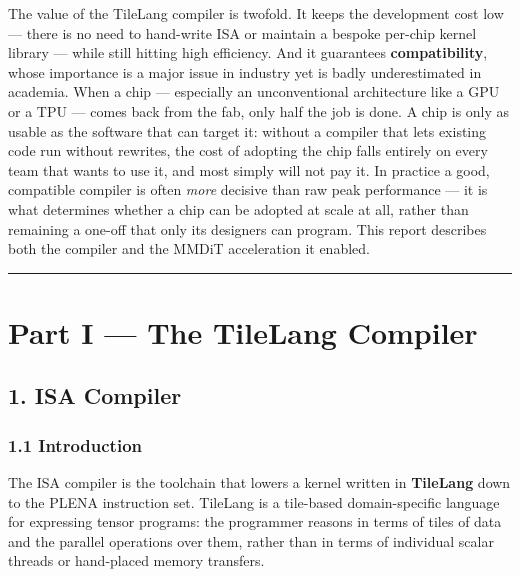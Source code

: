 \documentclass[
  10pt,
]{article}
\begin{document}
The value of the TileLang compiler is twofold. It keeps the development
cost low --- there is no need to hand-write ISA or maintain a bespoke
per-chip kernel library --- while still hitting high efficiency. And it
guarantees \textbf{compatibility}, whose importance is a major issue in
industry yet is badly underestimated in academia. When a chip ---
especially an unconventional architecture like a GPU or a TPU --- comes
back from the fab, only half the job is done. A chip is only as usable as
the software that can target it: without a compiler that lets existing
code run without rewrites, the cost of adopting the chip falls entirely
on every team that wants to use it, and most simply will not pay it. In
practice a good, compatible compiler is often \emph{more} decisive than
raw peak performance --- it is what determines whether a chip can be
adopted at scale at all, rather than remaining a one-off that only its
designers can program. This report describes both the compiler and the
MMDiT acceleration it enabled.

\begin{center}\rule{0.5\linewidth}{0.5pt}\end{center}

\section{Part I --- The TileLang Compiler}\label{part-compiler}

\subsection{1. ISA Compiler}\label{isa-compiler}

\subsubsection{1.1 Introduction}\label{isa-compiler-introduction}

The ISA compiler is the toolchain that lowers a kernel written in
\textbf{TileLang} down to the PLENA instruction set. TileLang is a
tile-based domain-specific language for expressing tensor programs: the
programmer reasons in terms of tiles of data and the parallel operations
over them, rather than in terms of individual scalar threads or
hand-placed memory transfers.
\end{document}
